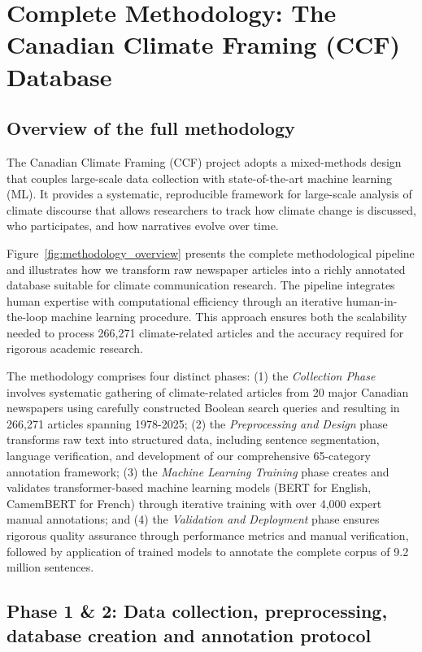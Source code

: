 \newpage
\section{Complete Methodology: The Canadian Climate Framing (CCF) Database}
\label{sec:appendix_methodology}

\subsection{Overview of the full methodology}

The Canadian Climate Framing (CCF) project adopts a mixed-methods design that couples large-scale data collection with state-of-the-art machine learning (ML). It provides a systematic, reproducible framework for large-scale analysis of climate discourse that allows researchers to track how climate change is discussed, who participates, and how narratives evolve over time.

Figure~\ref{fig:methodology_overview} presents the complete methodological pipeline and illustrates how we transform raw newspaper articles into a richly annotated database suitable for climate communication research. The pipeline integrates human expertise with computational efficiency through an iterative human-in-the-loop machine learning procedure. This approach ensures both the scalability needed to process 266,271 climate-related articles and the accuracy required for rigorous academic research.

The methodology comprises four distinct phases: (1) the \emph{Collection Phase} involves systematic gathering of climate-related articles from 20 major Canadian newspapers using carefully constructed Boolean search queries and resulting in 266,271 articles spanning 1978-2025; (2) the \emph{Preprocessing and Design} phase transforms raw text into structured data, including sentence segmentation, language verification, and development of our comprehensive 65-category annotation framework; (3) the \emph{Machine Learning Training} phase creates and validates transformer-based machine learning models (BERT for English, CamemBERT for French) through iterative training with over 4,000 expert manual annotations; and (4) the \emph{Validation and Deployment} phase ensures rigorous quality assurance through performance metrics and manual verification, followed by application of trained models to annotate the complete corpus of 9.2 million sentences.

\subsection{Phase 1 \& 2: Data collection, preprocessing, database creation and annotation protocol}

